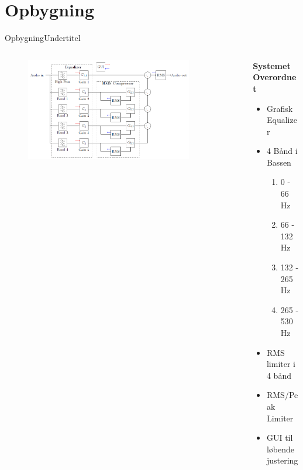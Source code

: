
\section{Opbygning}
\begin{frame}{Opbygning}{Undertitel}
\begin{columns}
  \begin{column}{0.70\textwidth}
\begin{figure}
\centering
\includegraphics[width=0.85\textwidth]{Mainsystemoverview}
\end{figure}
  \end{column}
  \begin{column}{0.30\textwidth}
  \textbf{Systemet Overordnet}
\begin{itemize}
\item Grafisk Equalizer
\item 4 Bånd i Bassen
\begin{enumerate}
\item 0   -   66 Hz
\item 66  -  132 Hz
\item 132 -  265 Hz
\item 265 -  530 Hz
\end{enumerate}
\item RMS limiter i 4 bånd
\item RMS/Peak Limiter
\item GUI til løbende justering
\end{itemize}
  \end{column}
\end{columns}
\end{frame}

